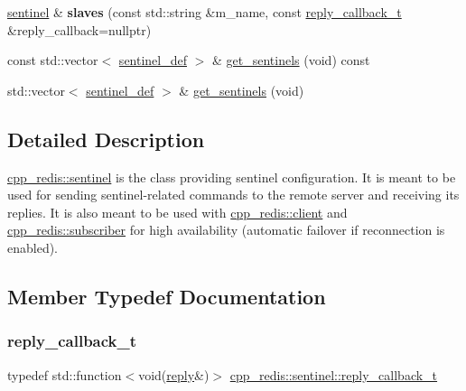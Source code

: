 \begin{DoxyCompactItemize}
\item 
\mbox{\label{classcpp__redis_1_1sentinel_aa4b19659807388d276764f9a79132d00}} 
\mbox{\hyperlink{classcpp__redis_1_1sentinel}{sentinel}} \& {\bfseries slaves} (const std\+::string \&m_name, const \mbox{\hyperlink{classcpp__redis_1_1sentinel_ae1a150ff8787208c47414397a061c9a7}{reply\+\_\+callback\+\_\+t}} \&reply\+\_\+callback=nullptr)
\item 
const std\+::vector$<$ \mbox{\hyperlink{classcpp__redis_1_1sentinel_1_1sentinel__def}{sentinel\+\_\+def}} $>$ \& \mbox{\hyperlink{classcpp__redis_1_1sentinel_adec98cdde0500e44b8fda26a44f14b49}{get\+\_\+sentinels}} (void) const
\item 
std\+::vector$<$ \mbox{\hyperlink{classcpp__redis_1_1sentinel_1_1sentinel__def}{sentinel\+\_\+def}} $>$ \& \mbox{\hyperlink{classcpp__redis_1_1sentinel_a62cc14b7795d746cc7d0053c1e0a3abd}{get\+\_\+sentinels}} (void)
\end{DoxyCompactItemize}


\subsection{Detailed Description}
\mbox{\hyperlink{classcpp__redis_1_1sentinel}{cpp\+\_\+redis\+::sentinel}} is the class providing sentinel configuration. It is meant to be used for sending sentinel-\/related commands to the remote server and receiving its replies. It is also meant to be used with \mbox{\hyperlink{classcpp__redis_1_1client}{cpp\+\_\+redis\+::client}} and \mbox{\hyperlink{classcpp__redis_1_1subscriber}{cpp\+\_\+redis\+::subscriber}} for high availability (automatic failover if reconnection is enabled). 

\subsection{Member Typedef Documentation}
\mbox{\label{classcpp__redis_1_1sentinel_ae1a150ff8787208c47414397a061c9a7}} 
\subsubsection{\texorpdfstring{reply\+\_\+callback\+\_\+t}{reply\_callback\_t}}
{\footnotesize\ttfamily typedef std\+::function$<$void(\mbox{\hyperlink{classcpp__redis_1_1reply}{reply}}\&)$>$ \mbox{\hyperlink{classcpp__redis_1_1sentinel_ae1a150ff8787208c47414397a061c9a7}{cpp\+\_\+redis\+::sentinel\+::reply\+\_\+callback\+\_\+t}}}

